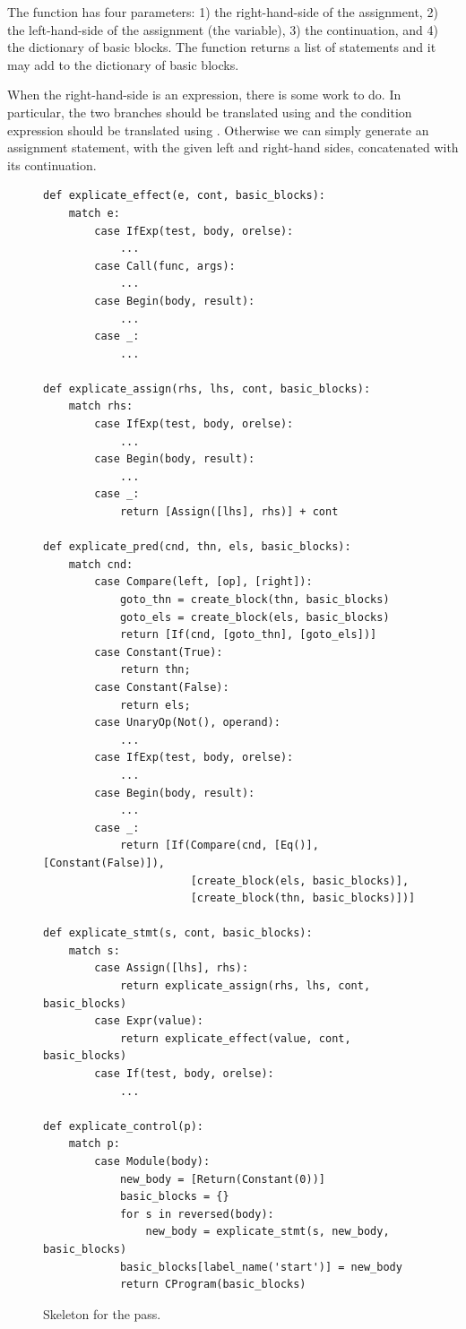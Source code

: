 \documentclass[7x10,nocrop]{TimesAPriori_MIT}%
\begin{document}
{The  function has four parameters: 1) the
right-hand-side of the assignment, 2) the left-hand-side of the
assignment (the variable), 3) the continuation, and 4) the dictionary
of basic blocks. The  function returns a list
of \LangCIf{} statements and it may add to the dictionary of basic
blocks.

When the right-hand-side is an  expression, there is some
work to do. In particular, the two branches should be translated using
 and the condition expression should be
translated using .  Otherwise we can simply
generate an assignment statement, with the given left and right-hand
sides, concatenated with its continuation.

\begin{figure}[tbp]
\begin{lstlisting}[basicstyle=\ttfamily\footnotesize]
def explicate_effect(e, cont, basic_blocks):
    match e:
        case IfExp(test, body, orelse):
            ...
        case Call(func, args):
            ...
        case Begin(body, result):
            ...
        case _:
            ...

def explicate_assign(rhs, lhs, cont, basic_blocks):
    match rhs:
        case IfExp(test, body, orelse):
            ...
        case Begin(body, result):
            ...
        case _:
            return [Assign([lhs], rhs)] + cont

def explicate_pred(cnd, thn, els, basic_blocks):
    match cnd:
        case Compare(left, [op], [right]):
            goto_thn = create_block(thn, basic_blocks)
            goto_els = create_block(els, basic_blocks)
            return [If(cnd, [goto_thn], [goto_els])]
        case Constant(True):
            return thn;
        case Constant(False):
            return els;
        case UnaryOp(Not(), operand):
            ...
        case IfExp(test, body, orelse):
            ...
        case Begin(body, result):
            ...
        case _:
            return [If(Compare(cnd, [Eq()], [Constant(False)]),
                       [create_block(els, basic_blocks)],
                       [create_block(thn, basic_blocks)])]

def explicate_stmt(s, cont, basic_blocks):
    match s:
        case Assign([lhs], rhs):
            return explicate_assign(rhs, lhs, cont, basic_blocks)
        case Expr(value):
            return explicate_effect(value, cont, basic_blocks)
        case If(test, body, orelse):
            ...

def explicate_control(p):
    match p:
        case Module(body):
            new_body = [Return(Constant(0))]
            basic_blocks = {}
            for s in reversed(body):
                new_body = explicate_stmt(s, new_body, basic_blocks)
            basic_blocks[label_name('start')] = new_body
            return CProgram(basic_blocks)
\end{lstlisting}
\caption{Skeleton for the  pass.}
\label{fig:explicate-control-Lif}
\end{figure}
\fi}
\end{document}
